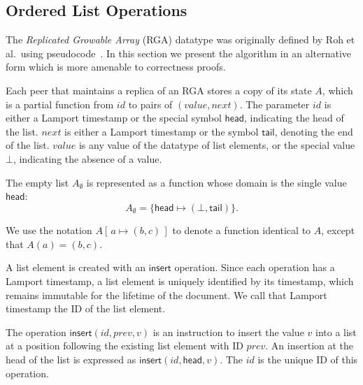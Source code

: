 \documentclass[a4paper,twocolumn,10pt]{article}
\begin{document}
\subsection{Ordered List Operations}

The \emph{Replicated Growable Array} (RGA) datatype was originally defined by Roh et al.\ using pseudocode~\cite{Roh:2011dw}. In this section we present the algorithm in an alternative form which is more amenable to correctness proofs.

Each peer that maintains a replica of an RGA stores a copy of its state $A$, which is a partial function from $\mathit{id}$ to pairs of $(\mathit{value}, \mathit{next})$. The parameter $\mathit{id}$ is either a Lamport timestamp or the special symbol $\mathsf{head}$, indicating the head of the list. $\mathit{next}$ is either a Lamport timestamp or the symbol $\mathsf{tail}$, denoting the end of the list. $\mathit{value}$ is any value of the datatype of list elements, or the special value $\bot$, indicating the absence of a value.

The empty list $A_\emptyset$ is represented as a function whose domain is the single value $\mathsf{head}$:
$$ A_\emptyset = \{\mathsf{head} \mapsto (\bot, \mathsf{tail})\}. $$

We use the notation $A[\,a \mapsto (b, c)\,]$ to denote a function identical to $A$, except that $A(a)=(b,c)$.

A list element is created with an $\mathsf{insert}$ operation. Since each operation has a Lamport timestamp, a list element is uniquely identified by its timestamp, which remains immutable for the lifetime of the document. We call that Lamport timestamp the ID of the list element.

The operation $\mathsf{insert}(\mathit{id}, \mathit{prev}, v)$ is an instruction to insert the value $v$ into a list at a position following the existing list element with ID $\mathit{prev}$. An insertion at the head of the list is expressed as $\mathsf{insert}(\mathit{id}, \mathsf{head}, v)$. The $\mathit{id}$ is the unique ID of this operation.
\end{document}
